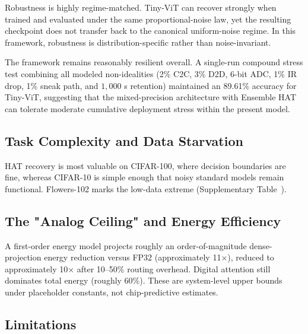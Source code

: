 Robustness is highly regime-matched. Tiny-ViT can recover strongly when trained and evaluated under the same proportional-noise law, yet the resulting checkpoint does not transfer back to the canonical uniform-noise regime. In this framework, robustness is distribution-specific rather than noise-invariant.

The framework remains reasonably resilient overall. A single-run compound stress test combining all modeled non-idealities (2\% C2C, 3\% D2D, 6-bit ADC, 1\% IR drop, 1\% sneak path, and $1{,}000$ s retention) maintained an 89.61\% accuracy for Tiny-ViT, suggesting that the mixed-precision architecture with Ensemble HAT can tolerate moderate cumulative deployment stress within the present model.

\subsection{Task Complexity and Data Starvation}

HAT recovery is most valuable on CIFAR-100, where decision boundaries are fine, whereas CIFAR-10 is simple enough that noisy standard models remain functional. Flowers-102 marks the low-data extreme (Supplementary Table~\SuppTableFlowers).

\subsection{The "Analog Ceiling" and Energy Efficiency}

A first-order energy model projects roughly an order-of-magnitude dense-projection energy reduction versus FP32 (approximately 11×), reduced to approximately 10× after 10--50\% routing overhead. Digital attention still dominates total energy (roughly 60\%). These are system-level upper bounds under placeholder constants, not chip-predictive estimates.

\subsection{Limitations}
\label{subsec:limitations}

